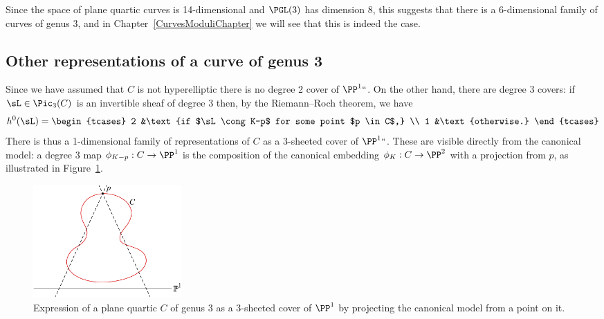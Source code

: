 Since the space of plane quartic curves is 14-dimensional and
$\PGL(3)$ has dimension 8,
this suggests that
there is a 6-dimensional family of curves of genus 3, and in
Chapter~\ref{CurvesModuliChapter}
we will see that
this is indeed the case.

\subsection*{Other representations of a curve of genus 3}
\label{other genus 3}
Since we have assumed that $C$ is not hyperelliptic there is no degree 2
cover of $\PP^1` `$. On the other hand, there are degree 3 covers: if $\sL \in
\Pic_3(C)$ is an invertible sheaf of degree 3 then, by the
%
Riemann--Roch theorem, we have
$$
h^0(\sL) =
\begin{tcases}
2 &\text{if $\sL \cong K-p$ for some point $p \in C$,} \\
1 &\text{otherwise.}
\end{tcases}
$$
There is thus a 1-dimensional family of representations of $C$ as a
3-sheeted cover of $\PP^1` `$. These are  visible directly from the canonical
model: a degree 3 map $\phi_{K-p} : C \to \PP^1$ is the composition of
the canonical embedding $\phi_K : C \to \PP^2$ with a projection from $p$,
as illustrated in Figure~\ref{g13 on quartic}.

\begin{figure}
\includegraphics[height=1.7in,trim=0 0 15 0,clip]{main/Fig05-3}%
 \caption{Expression of a plane quartic $C$ of genus 3 as a 3-sheeted
%
 cover of $\PP^1$ by projecting the canonical model from a point on it.}
 \label{g13 on quartic}
\end{figure}

